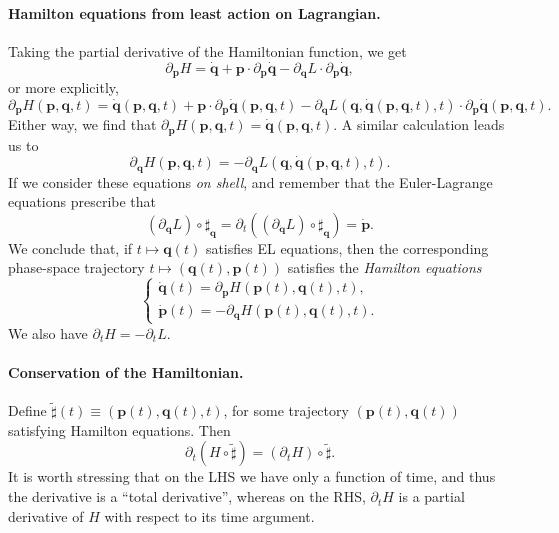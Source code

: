\documentclass[12pt]{report}
\newcommand{\bs}[1]{\boldsymbol{#1}}
\begin{document}
\paragraph{Hamilton equations from least action on Lagrangian.}
Taking the partial derivative of the Hamiltonian function, we get
\begin{equation}
	\partial_{\bs p}H=\dot{\bs q}+\bs p\cdot\partial_{\bs p}\dot{\bs q} - \partial_{\dot{\bs q}}L \cdot \partial_{\bs p}\dot{\bs q},
\end{equation}
or more explicitly,
\begin{equation}
	\partial_{\bs p}H(\bs p,\bs q, t) =
	\dot{\bs q}(\bs p, \bs q, t) +
	\bs p\cdot \partial_{\bs p}\dot{\bs q}(\bs p,\bs q, t) -
	\partial_{\dot{\bs q}}L(\bs q, \dot{\bs q}(\bs p,\bs q, t), t)
	\cdot \partial_{\bs p}\dot{\bs q}(\bs p, \bs q, t).
\end{equation}
Either way, we find that
$\partial_{\bs p}H(\bs p, \bs q, t) = \dot{\bs q}(\bs p, \bs q, t)$.
A similar calculation leads us to
\begin{equation}
	\partial_{\bs q}H(\bs p, \bs q, t) =
	- \partial_{\bs q}L(\bs q, \dot{\bs q}(\bs p, \bs q, t), t).
\end{equation}
If we consider these equations \emph{on shell}, and remember that the Euler-Lagrange equations prescribe that
\begin{equation}
	(\partial_{\bs q}L)\circ\sharp_{\bs q} =
	\partial_t((\partial_{\dot{\bs q}}L)\circ\sharp_{\bs q})
	= \dot{\bs p}.
\end{equation}
We conclude that, if $t\mapsto \bs q(t)$ satisfies EL equations, then
the corresponding phase-space trajectory $t\mapsto (\bs q(t),\bs p(t))$ satisfies the \emph{Hamilton equations}
\begin{equation}
	\begin{cases}
		\dot{\bs q}(t) = \partial_{\bs p}H(\bs p(t),\bs q(t), t), \\
		\dot{\bs p}(t) = -\partial_{\bs q}H(\bs p(t),\bs q(t), t).
	\end{cases}
\end{equation}
We also have $\partial_t H = -\partial_t L$.

\paragraph{Conservation of the Hamiltonian.}
Define $\tilde\sharp(t)\equiv (\bs p(t), \bs q(t),t)$, for some trajectory $(\bs p(t), \bs q(t))$ satisfying Hamilton equations.
Then
\begin{equation}
	\partial_t(H\circ\tilde\sharp) =
	(\partial_t H)\circ\tilde\sharp.
\end{equation}
It is worth stressing that on the LHS we have only a function of time, and thus the derivative is a ``total derivative'', whereas on the RHS, $\partial_t H$ is a partial derivative of $H$ with respect to its time argument.
\end{document}
